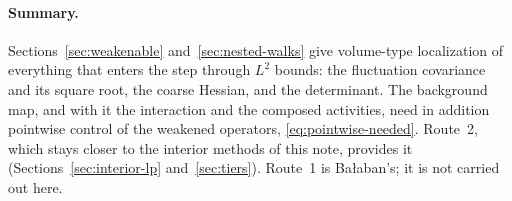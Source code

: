 \paragraph{Summary.} Sections~\ref{sec:weakenable} and~\ref{sec:nested-walks} give volume-type localization of everything that enters the step through $L^2$ bounds: the fluctuation covariance and its square root, the coarse Hessian, and the determinant. The background map, and with it the interaction and the composed activities, need in addition pointwise control of the weakened operators, \eqref{eq:pointwise-needed}. Route~2, which stays closer to the interior methods of this note, provides it (Sections~\ref{sec:interior-lp} and~\ref{sec:tiers}). Route~1 is Ba\l aban's; it is not carried out here.
